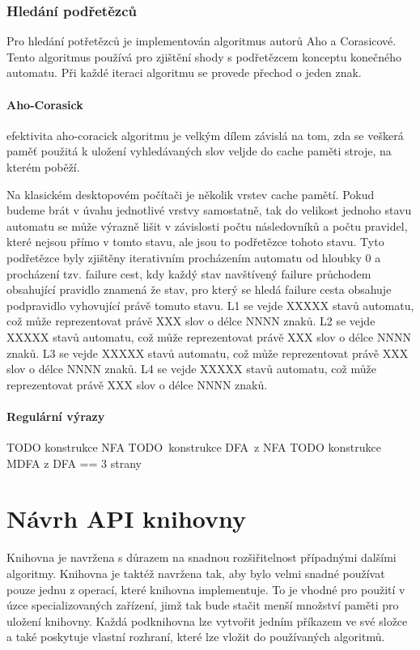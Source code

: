 \subsection{Hledání podřetězců}
Pro hledání potřetězců je implementován algoritmus autorů Aho a Corasicové. Tento algoritmus používá pro zjištění shody s podřetězcem konceptu konečného automatu. Při každé iteraci algoritmu se provede přechod o jeden znak.

\subsubsection{Aho-Corasick}
efektivita aho-coracick algoritmu je velkým dílem závislá na tom, zda se veškerá paměť použitá k uložení vyhledávaných slov veljde do cache paměti stroje, na kterém poběží.

Na klasickém desktopovém počítači je několik vrstev cache pamětí.
Pokud budeme brát v úvahu jednotlivé vrstvy samostatně, tak do
velikost jednoho stavu automatu se může výrazně lišit v závislosti počtu následovníků a počtu
pravidel, které nejsou přímo v tomto stavu, ale jsou to podřetězce tohoto stavu.
Tyto podřetězce byly zjištěny iterativním procházením automatu od hloubky 0 a procházení tzv. failure cest, kdy každý stav navštívený failure průchodem obsahující pravidlo znamená že stav, pro který se hledá failure cesta obsahuje podpravidlo vyhovující právě tomuto stavu.
L1 se vejde XXXXX stavů automatu, což může reprezentovat právě XXX slov o délce NNNN znaků.
L2 se vejde XXXXX stavů automatu, což může reprezentovat právě XXX slov o délce NNNN znaků.
L3 se vejde XXXXX stavů automatu, což může reprezentovat právě XXX slov o délce NNNN znaků.
L4 se vejde XXXXX stavů automatu, což může reprezentovat právě XXX slov o délce NNNN znaků.

\subsubsection{Regulární výrazy}

TODO konstrukce NFA
TODO konstrukce DFA z NFA
TODO konstrukce MDFA z DFA
== 3 strany


\subsection{}

\chapter{Návrh API knihovny}
Knihovna je navržena s důrazem na snadnou rozšiřitelnost případnými dalšími algoritmy.
Knihovna je taktéž navržena tak, aby bylo velmi snadné používat pouze jednu z operací, které knihovna implementuje.
To je vhodné pro použití v úzce specializovaných zařízení, jimž tak bude stačit menší množství paměti pro uložení knihovny.
Každá podknihovna lze vytvořit jedním příkazem ve své složce a také poskytuje vlastní rozhraní, které lze vložit do používaných algoritmů.

